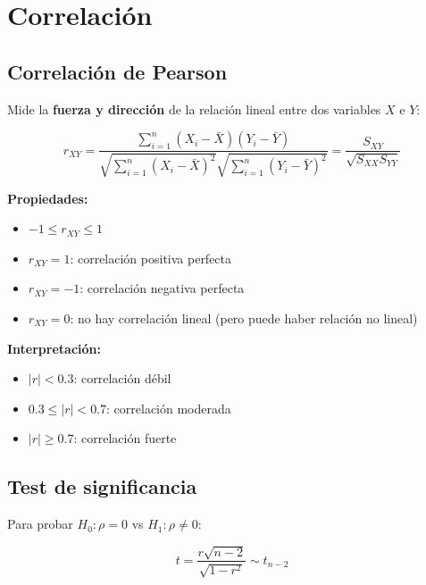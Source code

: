 \documentclass[11pt,a4paper]{article}
\begin{document}
\section{Correlación}

\subsection{Correlación de Pearson}

Mide la \textbf{fuerza y dirección} de la relación lineal entre dos variables $X$ e $Y$:

\begin{equation}
r_{XY} = \frac{\sum_{i=1}^{n}(X_i - \bar{X})(Y_i - \bar{Y})}{\sqrt{\sum_{i=1}^{n}(X_i - \bar{X})^2} \sqrt{\sum_{i=1}^{n}(Y_i - \bar{Y})^2}} = \frac{S_{XY}}{\sqrt{S_{XX}S_{YY}}}
\end{equation}

\textbf{Propiedades:}
\begin{itemize}
    \item $-1 \leq r_{XY} \leq 1$
    \item $r_{XY} = 1$: correlación positiva perfecta
    \item $r_{XY} = -1$: correlación negativa perfecta
    \item $r_{XY} = 0$: no hay correlación lineal (pero puede haber relación no lineal)
\end{itemize}

\textbf{Interpretación:}
\begin{itemize}
    \item $|r| < 0.3$: correlación débil
    \item $0.3 \leq |r| < 0.7$: correlación moderada
    \item $|r| \geq 0.7$: correlación fuerte
\end{itemize}

\subsection{Test de significancia}

Para probar $H_0: \rho = 0$ vs $H_1: \rho \neq 0$:

\begin{equation}
t = \frac{r \sqrt{n - 2}}{\sqrt{1 - r^2}} \sim t_{n-2}
\end{equation}
\end{document}
